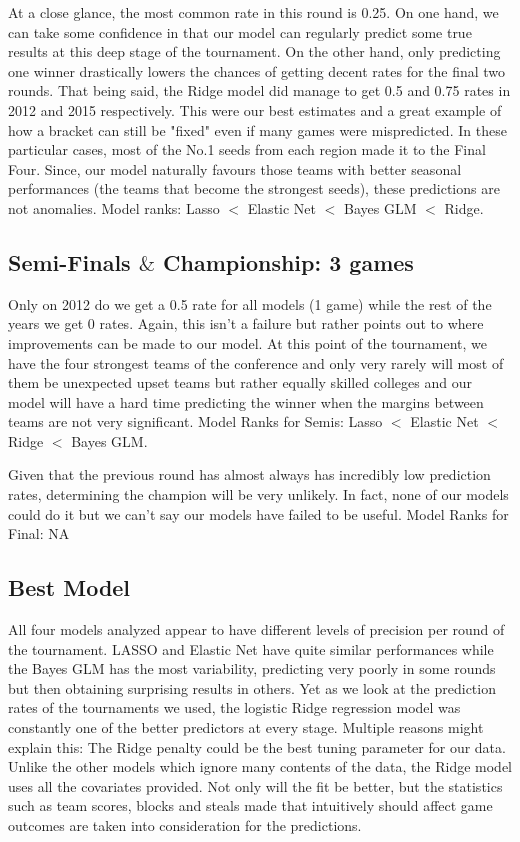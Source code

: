 \documentclass{article} %
\begin{document}
At a close glance, the most common rate in this round is 0.25. On one hand, we can take some confidence in that our model can regularly predict some true results at this deep stage of the tournament. On the other hand, only predicting one winner drastically lowers the chances of getting decent rates for the final two rounds. That being said, the Ridge model did manage to get 0.5 and 0.75 rates in 2012 and 2015 respectively. This were our best estimates and a great example of how a bracket can still be "fixed" even if many games were mispredicted. In these particular cases, most of the No.1 seeds from each region made it to the Final Four. Since, our model naturally favours those teams with better seasonal performances (the teams that become the strongest seeds), these predictions are not anomalies. Model ranks: Lasso  $<$ Elastic Net $<$ Bayes GLM $<$ Ridge.  

\subsection{Semi-Finals $\&$ Championship: 3 games}

Only on 2012 do we get a 0.5 rate for all models (1 game) while the rest of the years we get 0 rates. Again, this isn't a failure but rather points out to where improvements can be made to our model. At this point of the tournament, we have the four strongest teams of the conference and only very rarely will most of them be unexpected upset teams but rather equally skilled colleges and our model will have a hard time predicting the winner when the margins between teams are not very significant. Model Ranks for Semis: Lasso  $<$ Elastic Net $<$ Ridge $<$ Bayes GLM.  

Given that the previous round has almost always has incredibly low prediction rates, determining the champion will be very unlikely. In fact, none of our models could do it but we can't say our models have failed to be useful. Model Ranks for Final: NA

\subsection{Best Model}

All four models analyzed appear to have different levels of precision per round of the tournament. LASSO and Elastic Net have quite similar performances while the Bayes GLM has the most variability, predicting very poorly in some rounds but then obtaining surprising results in others. Yet as we look at the prediction rates of the tournaments we used, the logistic Ridge regression model was constantly one of the better predictors at every stage. Multiple reasons might explain this: The Ridge penalty could be the best tuning parameter for our data. Unlike the other models which ignore many contents of the data, the Ridge model uses all the covariates provided. Not only will the fit be better, but the statistics such as team scores, blocks and steals made that intuitively should affect game outcomes are taken into consideration for the predictions.
\end{document}
